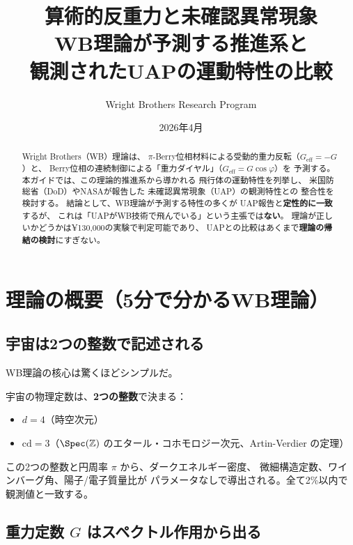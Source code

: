 \documentclass[11pt,a4paper]{article}
\title{算術的反重力と未確認異常現象\\[6pt]
\large WB理論が予測する推進系と\\
観測されたUAPの運動特性の比較}
\author{Wright Brothers Research Program}
\date{2026年4月}
\begin{document}
\maketitle

\begin{abstract}
Wright Brothers（WB）理論は、
$\pi$-Berry位相材料による受動的重力反転（$G_{\mathrm{eff}} = -G$）と、
Berry位相の連続制御による「重力ダイヤル」（$G_{\mathrm{eff}} = G\cos\varphi$）を
予測する。本ガイドでは、この理論的推進系から導かれる
飛行体の運動特性を列挙し、
米国防総省（DoD）やNASAが報告した
未確認異常現象（UAP）の観測特性との
整合性を検討する。
結論として、WB理論が予測する特性の多くが
UAP報告と\textbf{定性的に一致}するが、
これは「UAPがWB技術で飛んでいる」という主張では\textbf{ない}。
理論が正しいかどうかは¥130,000の実験で判定可能であり、
UAPとの比較はあくまで\textbf{理論の帰結の検討}にすぎない。
\end{abstract}

\tableofcontents
\newpage

\section{理論の概要（5分で分かるWB理論）}

\subsection{宇宙は2つの整数で記述される}

WB理論の核心は驚くほどシンプルだ。

\begin{tcolorbox}[colback=blue!5,colframe=blue!50!black,title=WBの基本主張]
宇宙の物理定数は、\textbf{2つの整数}で決まる：
\begin{itemize}
\item $d = 4$（時空次元）
\item $\mathrm{cd} = 3$（$\Spec(\mathbb{Z})$ のエタール・コホモロジー次元、Artin-Verdier の定理）
\end{itemize}
この2つの整数と円周率 $\pi$ から、ダークエネルギー密度、
微細構造定数、ワインバーグ角、陽子/電子質量比が
パラメータなしで導出される。全て2\%以内で観測値と一致する。
\end{tcolorbox}

\subsection{重力定数 $G$ はスペクトル作用から出る}
\end{document}

